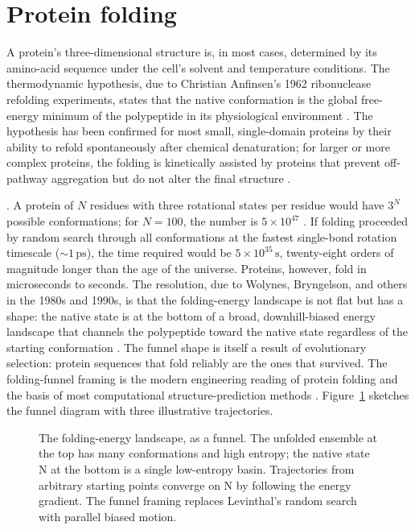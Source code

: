 \section{Protein folding}

A protein's three-dimensional structure is, in most cases,
determined by its amino-acid sequence under the cell's solvent and
temperature conditions. The thermodynamic hypothesis, due to Christian
Anfinsen's 1962 ribonuclease refolding experiments, states that the
native conformation is the global free-energy minimum of the
polypeptide in its physiological environment
\cite{paper:anfinsen1973-protein-folding,paper:v6c04-anfinsen-1973}.
The hypothesis has been confirmed for most small, single-domain
proteins by their ability to refold spontaneously after chemical
denaturation; for larger or more complex proteins, the folding is
kinetically assisted by  proteins that prevent
off-pathway aggregation but do not alter the final structure
\cite{paper:v6c04-saibil-chaperones-2013}.

. A protein of
$N$ residues with three rotational states per residue would have
$3^N$ possible conformations; for $N = 100$, the number is $5 \times
10^{47}$ \cite{paper:v6c04-levinthal-1968}. If folding proceeded by
random search through all conformations at the fastest single-bond
rotation timescale ($\sim 1\,\text{ps}$), the time required would be
$5 \times 10^{35}\,\text{s}$, twenty-eight orders of magnitude longer
than the age of the universe. Proteins, however, fold in microseconds
to seconds. The resolution, due to Wolynes, Bryngelson, and others in
the 1980s and 1990s, is that the folding-energy landscape is not
flat but has a  shape: the native state is
at the bottom of a broad, downhill-biased energy landscape that
channels the polypeptide toward the native state regardless of the
starting conformation \cite{paper:v6c04-bryngelson-wolynes-1987}. The
funnel shape is itself a result of evolutionary selection: protein
sequences that fold reliably are the ones that survived. The
folding-funnel framing is the modern engineering reading of protein
folding and the basis of most computational structure-prediction
methods \cite[ch.~6]{text:dill-bromberg-molecular-driving}.
Figure~\ref{fig:v6c04-funnel} sketches the funnel diagram with three
illustrative trajectories.

\begin{figure}[ht]
\centering

\caption{The folding-energy landscape, as a funnel. The unfolded
ensemble at the top has many conformations and high entropy; the
native state N at the bottom is a single low-entropy basin.
Trajectories from arbitrary starting points converge on N by
following the energy gradient. The funnel framing replaces
Levinthal's random search with parallel biased motion.}
\label{fig:v6c04-funnel}
\end{figure}

